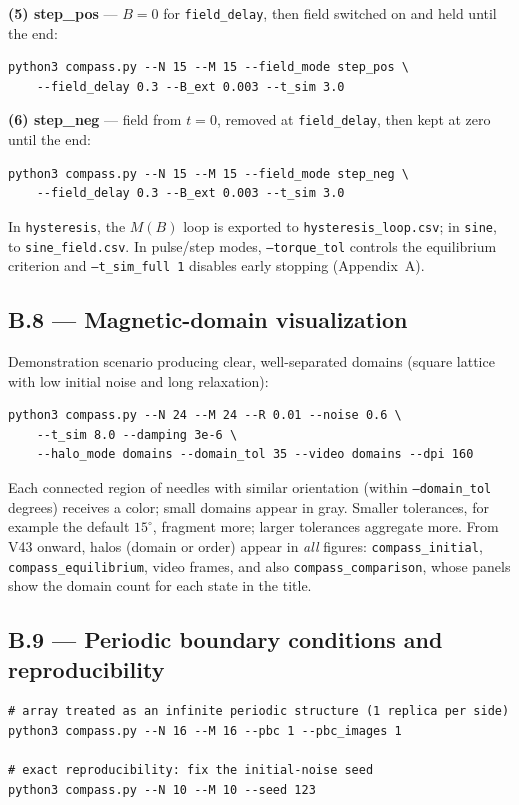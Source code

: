 \documentclass[11pt,a4paper]{article}
\newcommand{\code}[1]{\texttt{#1}}
\begin{document}
\noindent\textbf{(5) step\_pos} --- $B{=}0$ for \code{field\_delay}, then field switched on and held until the end:
\begin{verbatim}
python3 compass.py --N 15 --M 15 --field_mode step_pos \
    --field_delay 0.3 --B_ext 0.003 --t_sim 3.0
\end{verbatim}

\noindent\textbf{(6) step\_neg} --- field from $t{=}0$, removed at \code{field\_delay}, then kept at zero until the end:
\begin{verbatim}
python3 compass.py --N 15 --M 15 --field_mode step_neg \
    --field_delay 0.3 --B_ext 0.003 --t_sim 3.0
\end{verbatim}

\noindent In \code{hysteresis}, the $M(B)$ loop is exported to \code{hysteresis\_loop.csv}; in \code{sine}, to \code{sine\_field.csv}. In pulse/step modes, \code{--torque\_tol} controls the equilibrium criterion and \code{--t\_sim\_full 1} disables early stopping (Appendix~A).

\subsection*{B.8 --- Magnetic-domain visualization}

Demonstration scenario producing clear, well-separated domains (square lattice with low initial noise and long relaxation):
\begin{verbatim}
python3 compass.py --N 24 --M 24 --R 0.01 --noise 0.6 \
    --t_sim 8.0 --damping 3e-6 \
    --halo_mode domains --domain_tol 35 --video domains --dpi 160
\end{verbatim}
Each connected region of needles with similar orientation (within \code{--domain\_tol} degrees) receives a color; small domains appear in gray. Smaller tolerances, for example the default $15^\circ$, fragment more; larger tolerances aggregate more. From V43 onward, halos (domain or order) appear in \emph{all} figures: \code{compass\_initial}, \code{compass\_equilibrium}, video frames, and also \code{compass\_comparison}, whose panels show the domain count for each state in the title.

\subsection*{B.9 --- Periodic boundary conditions and reproducibility}

\begin{verbatim}
# array treated as an infinite periodic structure (1 replica per side)
python3 compass.py --N 16 --M 16 --pbc 1 --pbc_images 1

# exact reproducibility: fix the initial-noise seed
python3 compass.py --N 10 --M 10 --seed 123
\end{verbatim}
\end{document}
